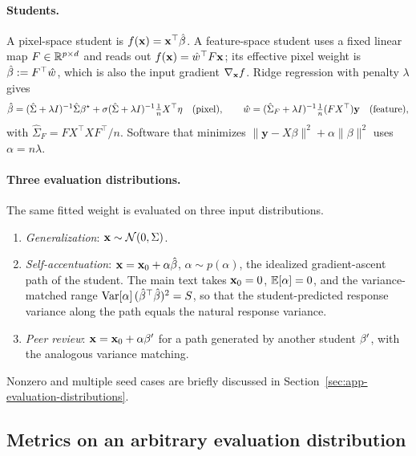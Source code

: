 \paragraph{Students.}
A pixel-space student is $f(\mathbf{x})=\mathbf{x}^\top\hat{\beta}$.  A feature-space student uses a
fixed linear map $F\in\mathbb{R}^{p\times d}$ and reads out $f(\mathbf{x})=\hat w^\top F\mathbf{x}$;
its effective pixel weight is $\hat{\beta}:=F^\top\hat w$, which is also the input
gradient $\nabla_{\mathbf{x}} f$.  Ridge regression with penalty $\lambda$ gives
\begin{equation}
\hat{\beta}=(\hat\Sigma+\lambda I)^{-1}\hat\Sigma{\beta^{\star}}
+\sigma(\hat\Sigma+\lambda I)^{-1}\tfrac1nX^\top\eta
\quad\text{(pixel)},\qquad
\hat w=(\hat\Sigma_F+\lambda I)^{-1}\tfrac1n(FX^\top)\mathbf y
\quad\text{(feature)},
\label{eq:mr-ridge}
\end{equation}
with $\hat\Sigma_F=FX^\top XF^\top/n$.  Software that minimizes
$\|\mathbf y-X\beta\|^2+\alpha\|\beta\|^2$ uses $\alpha=n\lambda$.

\paragraph{Three evaluation distributions.}
The same fitted weight is evaluated on three input distributions.
\begin{enumerate}
\item \emph{Generalization}: $\mathbf{x}\sim\mathcal N(0,\Sigma)$.
\item \emph{Self-accentuation}: $\mathbf{x}=\mathbf{x}_0+\alpha\hat{\beta}$, $\alpha\sim p(\alpha)$,
the idealized gradient-ascent path of the student.  The main text takes
$\mathbf{x}_0=0$, $\mathbb{E}[\alpha]=0$, and the variance-matched range
$\mathrm{Var}[\alpha]\,({\hat{\beta}}^\top\hat{\beta})^2=S$, so that the student-predicted
response variance along the path equals the natural response variance.
\item \emph{Peer review}: $\mathbf{x}=\mathbf{x}_0+\alpha{\beta^{\prime}}$ for a path generated by
another student ${\beta^{\prime}}$, with the analogous variance matching.
\end{enumerate}
Nonzero and multiple seed cases are briefly discussed in
Section~\ref{sec:app-evaluation-distributions}.

\subsection{Metrics on an arbitrary evaluation distribution}

